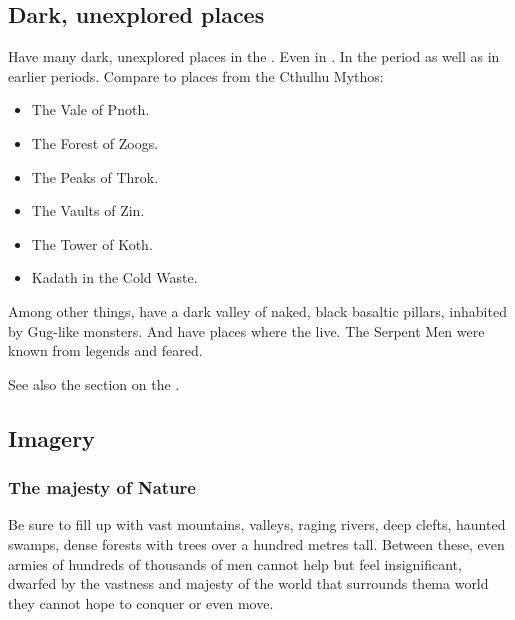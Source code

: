 \subsection{Dark, unexplored places}
Have many dark, unexplored  places in the \wylde. 
Even in \Velcad. 
In the \thirdbanewar period as well as in earlier periods. 
Compare to places from the Cthulhu Mythos:

\begin{itemize}
  \item The Vale of Pnoth.
  \item The Forest of Zoogs.
  \item The Peaks of Throk.
  \item The Vaults of Zin.
  \item The Tower of Koth. 
  \item Kadath in the Cold Waste.
\end{itemize}

Among other things, have a dark valley of naked, black basaltic pillars, inhabited by Gug-like monsters. 
And have places where the \quiljaaran live. 
The Serpent Men were known from legends and feared. 

See also the section on the .









\subsection{Imagery}





\subsubsection{The majesty of Nature}
Be sure to fill \Miith{} up with vast mountains, valleys, raging rivers, deep clefts, haunted swamps, dense forests with trees over a hundred metres tall. Between these, even armies of hundreds of thousands of men cannot help but feel insignificant, dwarfed by the vastness and majesty of the world that surrounds them\dash a world they cannot hope to conquer or even move. 

